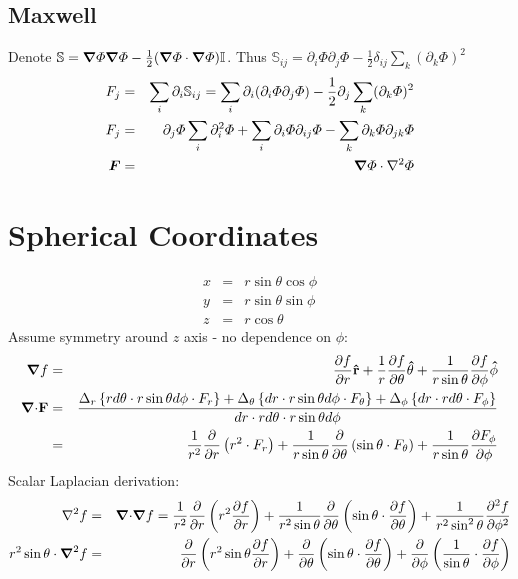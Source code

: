 \subsection{Maxwell}
Denote $\mathbb{S} = \boldsymbol{\nabla} \varPhi \boldsymbol{\nabla} \varPhi - \frac{1}{2} (\boldsymbol{\nabla} \varPhi \cdot \boldsymbol{\nabla} \varPhi) \mathbb{I}$.
Thus $\mathbb{S}_{ij} = \partial_i \varPhi \partial_j \varPhi - \frac{1}{2} \delta_{ij} \sum_{k} (\partial_k \varPhi)^2$
\begin{eqnarray}
F_j &=& \sum_i \partial_i \mathbb{S}_{ij} =
\sum_i \partial_i (\partial_i \varPhi \partial_j \varPhi) - \frac{1}{2} \partial_j \sum_{k} (\partial_k \varPhi)^2 \\
F_j &=&  \partial_j \varPhi \sum_i \partial^2_i \varPhi +
\sum_i \partial_i \varPhi \partial_{ij} \varPhi - \sum_{k} \partial_k \varPhi \partial_{jk} \varPhi \\
\boldsymbol{F} &=& \boldsymbol{\nabla} \varPhi \cdot \nabla^2 \varPhi
\end{eqnarray}

\section{Spherical Coordinates}
\begin{eqnarray}
x &=& r \sin \theta \cos \phi \\
y &=& r \sin \theta \sin \phi \\
z &=& r \cos \theta
\end{eqnarray}
Assume symmetry around $z$ axis - no dependence on $\phi$:
\begin{eqnarray}
\boldsymbol{\nabla} f &=& \frac{\partial f}{\partial r} \mathbf{\hat{r}} +
\frac{1}{r} \frac{\partial f}{\partial \theta} \mathbf{\hat{\theta}} +
\frac{1}{r \sin\theta} \frac{\partial f}{\partial \phi} \mathbf{\hat{\phi}}
\\
\boldsymbol{\nabla} \mathbf{\cdot} \mathbf{F} &=& \frac{
\Delta_r\left\{r d\theta \cdot r \sin \theta d\phi \cdot F_r\right\} +
\Delta_\theta\left\{dr \cdot r \sin \theta d\phi \cdot F_\theta\right\} +
\Delta_\phi\left\{dr \cdot r d\theta \cdot F_\phi\right\}
}{dr \cdot r d\theta \cdot r \sin \theta d\phi}
\\
&=& \frac{1}{r^2}\frac{\partial}{\partial r} \left( r^2 \cdot F_r\right)
  + \frac{1}{r \sin\theta} \frac{\partial}{\partial \theta} \left( \sin\theta \cdot F_\theta\right)
  + \frac{1}{r \sin\theta} \frac{\partial F_\phi}{\partial \phi}
\end{eqnarray}
Scalar Laplacian derivation:
\begin{eqnarray}
\nabla^2 f &=& \boldsymbol{\nabla} \mathbf{\cdot} \boldsymbol{\nabla} f = \frac{1}{r^2}\frac{\partial}{\partial r}
\left( r^2 \frac{\partial f}{\partial r} \right) +
\frac{1}{r^2 \sin\theta} \frac{\partial}{\partial \theta} \left( \sin\theta \cdot \frac{\partial f}{\partial \theta}\right)
+ \frac{1}{r^2 \sin^2\theta} \frac{\partial^2 f}{\partial \phi^2}
\\
r^2 \sin\theta \cdot \boldsymbol{\nabla}^2 f &=& \frac{\partial}{\partial r} \left( r^2 \sin \theta \frac{\partial f}{\partial r} \right) +
\frac{\partial}{\partial \theta} \left( \sin\theta \cdot \frac{\partial f}{\partial \theta}\right) +
\frac{\partial}{\partial \phi} \left( \frac{1}{\sin\theta} \cdot \frac{\partial f}{\partial \phi}\right)
\end{eqnarray}

